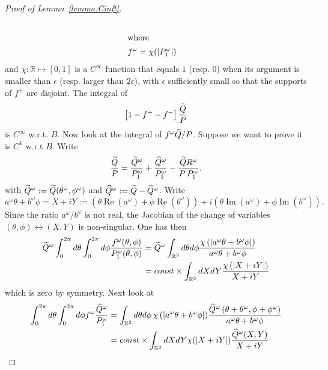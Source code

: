 \documentclass[10pt]{amsart}
\theoremstyle{definition}\newtheorem{defi}[theo]{Definition}\newtheorem{rema}[theo]{Remark}\newtheorem{exam}[theo]{Example}\newtheorem{exem}[theo]{Example}\newtheorem{nota}[theo]{Notation}
\newcommand{\bbR}{\mathbb{R}}
\DeclareMathOperator{\Rell}{Re}
\DeclareMathOperator{\Imm}{Im}
\let\oldtilde\tilde
\renewcommand*{\tilde}[1]{\mathchoice{\widetilde{#1}}{\widetilde{#1}}{\oldtilde{#1}}{\oldtilde{#1}}}
\let\oldhat\hat
\renewcommand*{\hat}[1]{\mathchoice{\widehat{#1}}{\widehat{#1}}{\oldhat{#1}}{\oldhat{#1}}}
\begin{document}
\begin{proof}[{Proof of Lemma~\ref{lemma:Cinft}}]
\begin{align}
\\
\intertext{where}
f^\omega &=\chi(|P^\omega_1|)
\end{align}
and $\chi:\bbR\mapsto [0,1]$ is a $C^\infty$ function that equals $1$ (resp. $0$) when its argument is smaller than $\epsilon$ (resp. larger than $2\epsilon$), with $\epsilon$ sufficiently small so that the supports of $f^\pm$ are disjoint. The integral of
\begin{equation}
\left[1-f^+-f^-\right]\frac{\tilde Q}P
\end{equation}
is $C^\infty$ w.r.t. $B$. Now look at the integral of $f^\omega \tilde Q/P$. Suppose we want to prove it is $C^k$ w.r.t $B$. Write
\begin{equation}\label{eq:Taylor}
\frac{\tilde Q}P=\frac{\tilde Q^\omega}{P^\omega_1}+\frac{\hat Q^\omega}{P^\omega_1}- \frac {\tilde Q R^\omega} { P\,P^\omega_1},
\end{equation}
with $\tilde Q^\omega:=\tilde Q(\theta^\omega,\phi^\omega)$ and $\hat Q^\omega:=\tilde Q-\tilde Q^\omega$. Write
\begin{equation}
a^\omega\theta+b^\omega\phi=X+i Y:=(\theta\Rell (a^\omega)+\phi\Rell(b^\omega))+i \left(\theta\Imm (a^\omega)+\phi\Imm(b^\omega)\right).
\end{equation}
Since the ratio $a^\omega/b^\omega$ is not real, the Jacobian of the change of variables $(\theta,\phi)\leftrightarrow (X,Y)$ is non-singular. One has then
\begin{equation}
\begin{aligned}
\tilde Q^\omega \int_0^{2\pi} d\theta \int_0^{2\pi}d\phi\frac{f^\omega(\theta,\phi)}{P^\omega_1(\theta,\phi)} &=\tilde Q^\omega\int_{\bbR^2} d\theta d\phi \frac{\chi\left(\left|a^\omega \theta+b^\omega\phi\right|\right) }{a^\omega\theta+b^\omega\phi}
\\ &=const\times \int_{\bbR^2} dX dY \frac{\chi\left(\left|X+i Y\right|\right)}{X+i Y}
\end{aligned}
\end{equation}
which is zero by symmetry. Next look at
\begin{align}
\int_0^{2\pi} d\theta \int_0^{2\pi}d\phi {f^\omega }\frac{\hat Q^\omega}{P^\omega_1}
&=\int_{\bbR^2} d\theta d\phi\,{\chi\left(\left|a^\omega \theta+b^\omega\phi\right|\right)}\frac{\hat Q^\omega \left(\theta+\theta^\omega,\phi+\phi^\omega\right)}{a^\omega\theta+b^\omega\phi}\\
&= const\times \int_{\bbR^2}dX dY\chi(|X+iY|) \frac{\hat Q^\omega(X,Y)}{X+i Y}\label{eq:dadc}
\end{align}

\end{proof}
\end{document}
